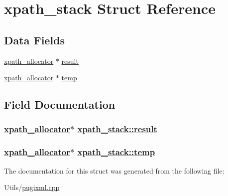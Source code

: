 \hypertarget{structxpath__stack}{
\section{xpath\_\-stack Struct Reference}
\label{structxpath__stack}
}
\subsection*{Data Fields}
\begin{CompactItemize}
\item 
\hyperlink{classxpath__allocator}{xpath\_\-allocator} $\ast$ \hyperlink{structxpath__stack_dce164b779cbb3d1bc093a772067ea7e}{result}
\item 
\hyperlink{classxpath__allocator}{xpath\_\-allocator} $\ast$ \hyperlink{structxpath__stack_48edd585dfb910c6c016559f07fea0d8}{temp}
\end{CompactItemize}


\subsection{Field Documentation}
\hypertarget{structxpath__stack_dce164b779cbb3d1bc093a772067ea7e}{
\subsubsection[result]{\setlength{\rightskip}{0pt plus 5cm}\hyperlink{classxpath__allocator}{xpath\_\-allocator}$\ast$ \hyperlink{structxpath__stack_dce164b779cbb3d1bc093a772067ea7e}{xpath\_\-stack::result}}}
\label{structxpath__stack_dce164b779cbb3d1bc093a772067ea7e}


\hypertarget{structxpath__stack_48edd585dfb910c6c016559f07fea0d8}{
\subsubsection[temp]{\setlength{\rightskip}{0pt plus 5cm}\hyperlink{classxpath__allocator}{xpath\_\-allocator}$\ast$ \hyperlink{structxpath__stack_48edd585dfb910c6c016559f07fea0d8}{xpath\_\-stack::temp}}}
\label{structxpath__stack_48edd585dfb910c6c016559f07fea0d8}




The documentation for this struct was generated from the following file:\begin{CompactItemize}
\item 
Utils/\hyperlink{pugixml_8cpp}{pugixml.cpp}\end{CompactItemize}
